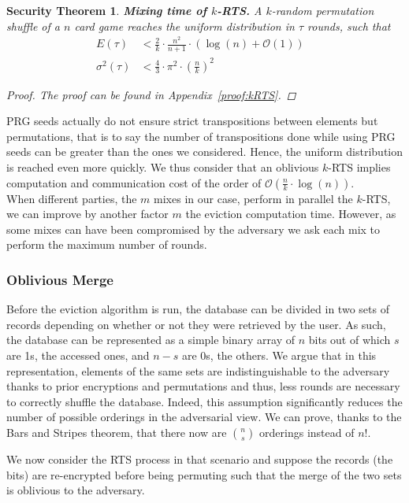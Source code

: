 \documentclass{llncs}
\newtheorem{secthm}{Security Theorem}
\begin{document}
\begin{secthm}
\textbf{Mixing time of $k$-RTS.} A $k$-random permutation shuffle of a $n$ card game reaches the uniform distribution in $\tau$ rounds, such that
\begin{align*}
E(\tau) &< \frac{2}{k}\cdot\frac{n^2}{n+1}\cdot \left ( \log(n) + \mathcal{O}(1) \right ) &\\
\sigma^2(\tau) &< \frac{4}{3} \cdot {\pi}^2 \cdot \left ( \frac{n}{k} \right )^2 &
\end{align*}
\begin{proof}
The proof can be found in Appendix~\ref{proof:kRTS}.
\end{proof}
\end{secthm}

PRG seeds actually do not ensure strict transpositions between elements but permutations, that is to say the number of transpositions done while using PRG seeds can be greater than the ones we considered. Hence, the uniform distribution is reached even more quickly. We thus consider that an oblivious $k$-RTS implies computation and communication cost of the order of $\mathcal{O} \left(\frac{n}{k}\cdot \log(n)\right)$.\\

When different parties, the $m$ mixes in our case, perform in parallel the $k$-RTS, we can improve by another factor $m$ the eviction computation time. However, as some mixes can have been compromised by the adversary we ask each mix to perform the maximum number of  rounds.

%
\subsubsection{Oblivious Merge}\label{OM}
Before the eviction algorithm is run, the database can be divided in two sets of records depending on whether or not they were retrieved by the user. As such, the database can be represented as a simple binary array of $n$ bits out of which $s$ are 1s, the accessed ones, and $n-s$ are 0s, the others.
We argue that in this representation, elements of the same sets are indistinguishable to the adversary thanks to prior encryptions and permutations and thus, less rounds are necessary to correctly shuffle the database.
Indeed, this assumption significantly reduces the number of possible orderings in the adversarial view. We can prove, thanks to the Bars and Stripes theorem, that there now are ${n \choose s}$ orderings instead of $n!$.

We now consider the RTS process in that scenario and suppose the records (the bits) are re-encrypted before being permuting such that the merge of the two sets is oblivious to the adversary.
\end{document}
